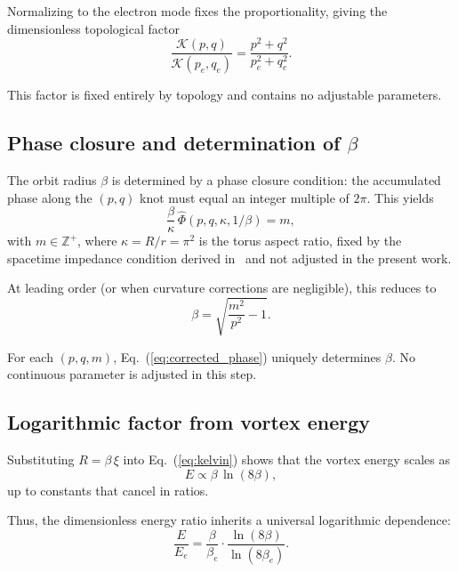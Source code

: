 \documentclass[11pt,a4paper]{article}
\begin{document}
Normalizing to the electron mode fixes the proportionality,
giving the dimensionless topological factor
\begin{equation}
  \frac{\mathcal{K}(p,q)}{\mathcal{K}(p_e,q_e)}
  = \frac{p^2 + q^2}{p_e^2 + q_e^2}.
\end{equation}

This factor is fixed entirely by topology and contains no adjustable
parameters.

\subsection{Phase closure and determination of $\beta$}

The orbit radius $\beta$ is determined by a phase closure condition:
the accumulated phase along the $(p,q)$ knot must equal an integer
multiple of $2\pi$.  This yields
\begin{equation}
  \frac{\beta}{\kappa}\,\hat{\Phi}(p,q,\kappa,1/\beta) = m,
  \label{eq:corrected_phase}
\end{equation}
with $m \in \mathbb{Z}^+$, where $\kappa = R/r = \pi^2$ is the
torus aspect ratio, fixed by the spacetime impedance condition
derived in~\cite{paper4} and not adjusted in the present work.

At leading order (or when curvature corrections are negligible),
this reduces to
\begin{equation}
  \beta = \sqrt{\frac{m^2}{p^2} - 1}.
  \label{eq:beta_simple}
\end{equation}

For each $(p,q,m)$, Eq.~(\ref{eq:corrected_phase}) uniquely
determines $\beta$.  No continuous parameter is adjusted in this
step.

\subsection{Logarithmic factor from vortex energy}

Substituting $R = \beta\,\xi$ into Eq.~(\ref{eq:kelvin}) shows
that the vortex energy scales as
\begin{equation}
  E \propto \beta\,\ln(8\beta),
\end{equation}
up to constants that cancel in ratios.

Thus, the dimensionless energy ratio inherits a universal
logarithmic dependence:
\begin{equation}
  \frac{E}{E_e}
  = \frac{\beta}{\beta_e}
  \cdot \frac{\ln(8\beta)}{\ln(8\beta_e)}.
\end{equation}
\end{document}
